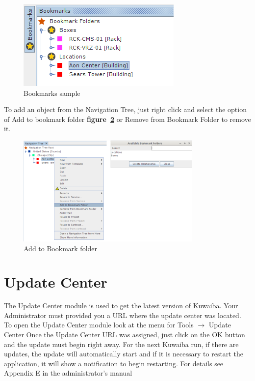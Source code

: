 \documentclass[a4paper]{article}
\begin{document}
			\begin{figure}[h!]
				\centering
				\includegraphics[width=0.5\linewidth]{img/bookmarks.png}
				\caption{Bookmarks sample}
				\label{fig:bookmakrs}
			\end{figure}
			
			To add an object from the Navigation Tree, just right click and select the option of Add to bookmark folder \textbf{figure~\ref{fig:add_to_bookmark_folder}} or Remove from Bookmark Folder to remove it.
						
			\begin{figure}[h!]
				\centering
				\includegraphics[width=0.8\linewidth]{img/bm_add_to_bookmark_folder.png}
				\caption{Add to Bookmark folder}
				\label{fig:add_to_bookmark_folder}
			\end{figure}
							
		\newpage
		\section{Update Center}\label{sec:update_center}
		The Update Center module is used to get the latest version of Kuwaiba. Your Administrator must provided you a URL where the update center was located. To open the Update Center module look at the menu for Tools $\rightarrow$ Update Center
		\newline
		Once the Update Center URL was assigned, just click on the OK button and the update must begin right away. For the next Kuwaiba run, if there are updates, the update will automatically start and if it is necessary to restart the application, it will show a notification to begin restarting.
		\newline
		For details see Appendix E in the administrator's manual
		
\end{document}
